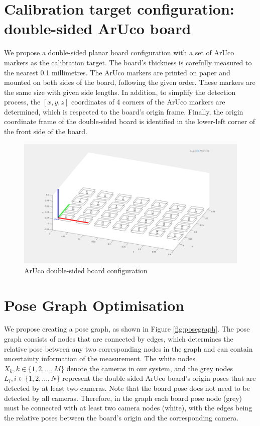 \section{Calibration target configuration: double-sided ArUco board}
We propose a double-sided planar board configuration with a set of ArUco markers as the calibration target. The board's thickness is carefully measured to the nearest 0.1 millimetres. The ArUco markers are printed on paper and mounted on both sides of the board, following the given order. These markers are the same size with given side lengths. In addition, to simplify the detection process, the $[x, y, z]$ coordinates of 4 corners of the ArUco markers are determined, which is respected to the board's origin frame. Finally, the origin coordinate frame of the double-sided board is identified in the lower-left corner of the front side of the board.
\vspace{5mm}

\begin{figure}[ht]
\centering
\includegraphics[width=1\textwidth]{Images/ArUco board configuration.png}
\caption{ArUco double-sided board configuration}
\end{figure}

\clearpage
\section{Pose Graph Optimisation}

We propose creating a pose graph, as shown in Figure \ref{fig:posegraph}. The pose graph consists of nodes that are connected by edges, which determines the relative pose between any two corresponding nodes in the graph and can contain uncertainty information of the measurement. The white nodes $X_{k}, k \in \{1,2,..., M\}$ denote the cameras in our system, and the grey nodes $L_{i}, i \in \{1,2,..., N\}$ represent the double-sided ArUco board's origin poses that are detected by at least two cameras. Note that the board pose does not need to be detected by all cameras. Therefore, in the graph each board pose node (grey) must be connected with at least two camera nodes (white), with the edges being the relative poses between the board's origin and the corresponding camera.



